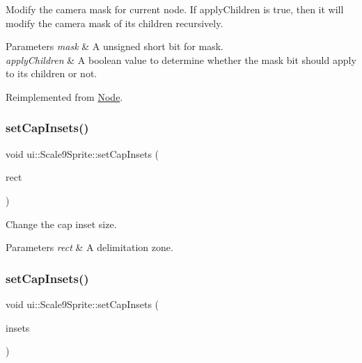 Modify the camera mask for current node. If apply\+Children is true, then it will modify the camera mask of its children recursively. 
\begin{DoxyParams}{Parameters}
{\em mask} & A unsigned short bit for mask. \\
\hline
{\em apply\+Children} & A boolean value to determine whether the mask bit should apply to its children or not. \\
\hline
\end{DoxyParams}


Reimplemented from \hyperlink{classNode_a0403546687b2cb6fc211fb461e33ba4d}{Node}.

\mbox{\label{classui_1_1Scale9Sprite_a6ebd3b7211991bd3b33a9771f6e2b13a}} 
\subsubsection{\texorpdfstring{set\+Cap\+Insets()}{setCapInsets()}\hspace{0.1cm}{\footnotesize\ttfamily [1/2]}}
{\footnotesize\ttfamily void ui\+::\+Scale9\+Sprite\+::set\+Cap\+Insets (\begin{DoxyParamCaption}\item[{const \hyperlink{classRect}{Rect} \&}]{rect }\end{DoxyParamCaption})}



Change the cap inset size. 


\begin{DoxyParams}{Parameters}
{\em rect} & A delimitation zone. \\
\hline
\end{DoxyParams}
\mbox{\label{classui_1_1Scale9Sprite_a71cc0602798744ca6be3451b49239809}} 
\subsubsection{\texorpdfstring{set\+Cap\+Insets()}{setCapInsets()}\hspace{0.1cm}{\footnotesize\ttfamily [2/2]}}
{\footnotesize\ttfamily void ui\+::\+Scale9\+Sprite\+::set\+Cap\+Insets (\begin{DoxyParamCaption}\item[{const \hyperlink{classRect}{Rect} \&}]{insets }\end{DoxyParamCaption})}

